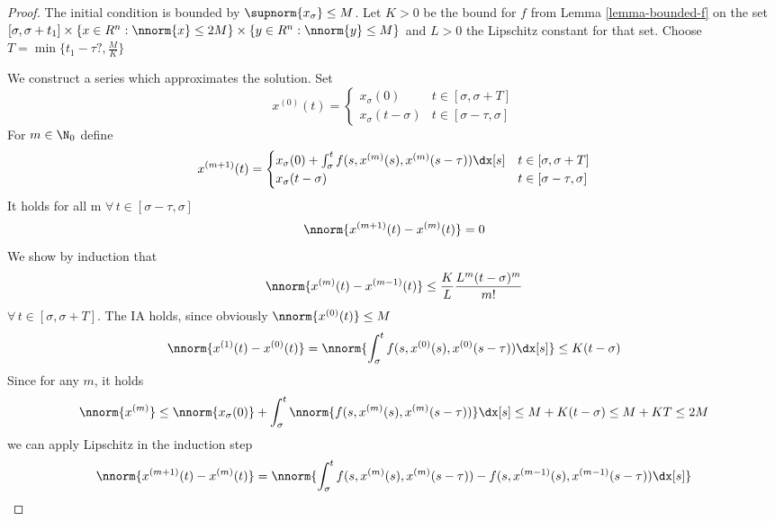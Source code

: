 \begin{proof}
    The initial condition is bounded by $\supnorm{x_\sigma}\leq M$.
    Let $K>0$ be the bound for $f$ from Lemma \ref{lemma-bounded-f} on the set $[\sigma,\sigma+t_1] \times \{x\in R^n: \nnorm{x}\leq 2M\}\times \{y\in R^n: \nnorm{y}\leq M\}$ and $L>0$ the Lipschitz constant for that set. Choose $T=\min\{t_1-\tau ?, \frac{M}{K}\}$

    We construct a series which approximates the solution.
    Set
    \begin{equation}
        x^{(0)}(t)= \begin{cases}
            x_\sigma(0) & t\in [\sigma,\sigma+T]\\
            x_\sigma(t-\sigma) & t\in [\sigma-\tau,\sigma]
        \end{cases}
    \end{equation}
    For $m\in\N_0$ define
    \begin{equation}
        x^{(m+1)}(t)= \begin{cases}
            x_\sigma(0) + \int_\sigma^t f(s,x^{(m)}(s),x^{(m)}(s-\tau))\dx[s] & t\in [\sigma,\sigma+T]\\
            x_\sigma(t-\sigma) & t\in [\sigma-\tau,\sigma]
        \end{cases}
    \end{equation}
    It holds for all m $\forall\,t\in [\sigma-\tau,\sigma]$
    \begin{equation}
        \nnorm{x^{(m+1)}(t)-x^{(m)}(t)}=0
    \end{equation}
    We show by induction that
    \begin{equation}
        \nnorm{x^{(m)}(t)-x^{(m-1)}(t)} \leq \frac{K}{L}\frac{L^m (t-\sigma)^m}{m!}
    \end{equation}
    $\forall\,t\in [\sigma,\sigma+T]$.
    The IA holds, since obviously $\nnorm{x^{(0)}(t)}\leq M$
    \begin{equation}
        \nnorm{x^{(1)}(t)-x^{(0)}(t)} = \nnorm{\int_\sigma^t f(s,x^{(0)}(s),x^{(0)}(s-\tau))\dx[s]} \leq K(t-\sigma)
    \end{equation}
    Since for any $m$, it holds
    \begin{equation}
        \nnorm{x^{(m)}}\leq \nnorm{x_\sigma(0)} + \int_\sigma^t \nnorm{f(s,x^{(m)}(s),x^{(m)}(s-\tau))}\dx[s]
        \leq M + K(t-\sigma) \leq M+KT \leq 2M
    \end{equation}
    we can apply Lipschitz in the induction step
    \begin{align}
        \nnorm{x^{(m+1)}(t)-x^{(m)}(t)} &= \nnorm{\int_\sigma^t f(s,x^{(m)}(s),x^{(m)}(s-\tau)) - f(s,x^{(m-1)}(s),x^{(m-1)}(s-\tau))\dx[s]}\\

\end{align}
\end{proof}

